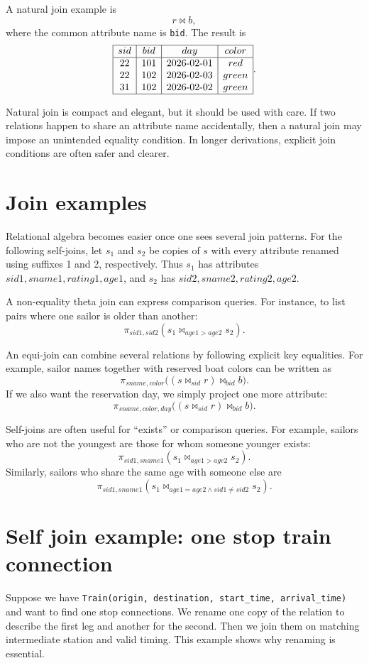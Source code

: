 \documentclass[11pt,a4paper,openany]{book}
\newcommand{\RAproject}{\pi}
\newcommand{\join}{\bowtie}
\begin{document}
A natural join example is
\[
r \join b,
\]
where the common attribute name is \texttt{bid}. The result is
\[
\begin{array}{|c|c|c|c|}\hline
sid&bid&day&color\\\hline
22&101&2026\text{-}02\text{-}01&red\\
22&102&2026\text{-}02\text{-}03&green\\
31&102&2026\text{-}02\text{-}02&green\\\hline
\end{array}.
\]

Natural join is compact and elegant, but it should be used with care. If two relations happen to share an attribute name accidentally, then a natural join may impose an unintended equality condition. In longer derivations, explicit join conditions are often safer and clearer.

\section{Join examples}
Relational algebra becomes easier once one sees several join patterns. For the following self-joins, let \(s_1\) and \(s_2\) be copies of \(s\) with every attribute renamed using suffixes 1 and 2, respectively. Thus \(s_1\) has attributes \(sid1,sname1,rating1,age1\), and \(s_2\) has \(sid2,sname2,rating2,age2\).

A non-equality theta join can express comparison queries. For instance, to list pairs where one sailor is older than another:
\[
\RAproject_{sid1,sid2}(s_1 \join_{age1>age2} s_2).
\]

An equi-join can combine several relations by following explicit key equalities. For example, sailor names together with reserved boat colors can be written as
\[
\RAproject_{sname,color}\bigl((s \join_{sid} r)\join_{bid} b\bigr).
\]
If we also want the reservation day, we simply project one more attribute:
\[
\RAproject_{sname,color,day}\bigl((s \join_{sid} r)\join_{bid} b\bigr).
\]

Self-joins are often useful for ``exists'' or comparison queries. For example, sailors who are not the youngest are those for whom someone younger exists:
\[
\RAproject_{sid1,sname1}(s_1 \join_{age1>age2} s_2).
\]
Similarly, sailors who share the same age with someone else are
\[
\RAproject_{sid1,sname1}(s_1 \join_{age1=age2\wedge sid1\neq sid2} s_2).
\]

\section{Self join example: one stop train connection}
Suppose we have \texttt{Train(origin, destination, start\_time, arrival\_time)} and want to find one stop connections. We rename one copy of the relation to describe the first leg and another for the second. Then we join them on matching intermediate station and valid timing. This example shows why renaming is essential.
\end{document}
